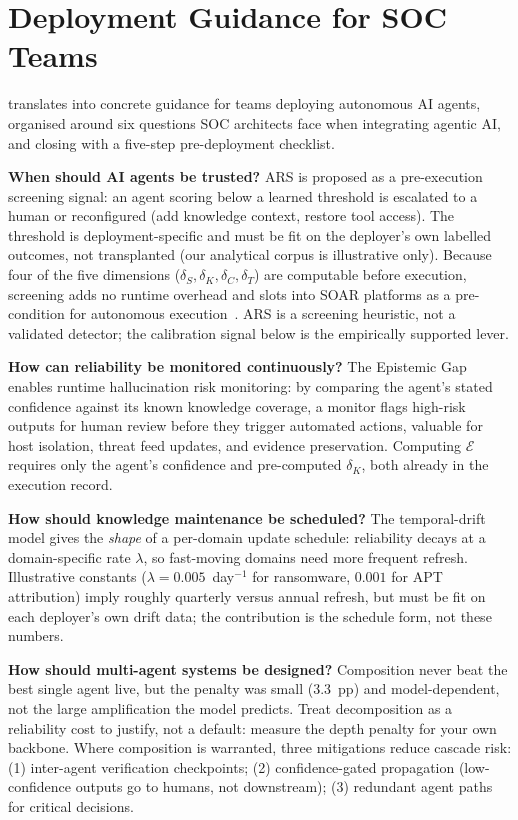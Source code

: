 \section{Deployment Guidance for SOC Teams}

\ARES{} translates into concrete guidance for teams deploying
autonomous AI agents, organised around six questions SOC architects
face when integrating agentic AI, and closing with a five-step
pre-deployment checklist.

\textbf{When should AI agents be trusted?}
ARS is proposed as a pre-execution screening signal: an agent scoring
below a learned threshold is escalated to a human or reconfigured
(add knowledge context, restore tool access). The threshold is
deployment-specific and must be fit on the deployer's own labelled
outcomes, not transplanted (our analytical corpus is illustrative
only). Because four of the five dimensions ($\delta_S, \delta_K,
\delta_C, \delta_T$) are computable before execution, screening adds no
runtime overhead and slots into SOAR platforms as a pre-condition for
autonomous execution~\cite{nist_ai_rmf}. ARS is a screening heuristic,
not a validated detector; the calibration signal below is the
empirically supported lever.

\textbf{How can reliability be monitored continuously?}
The Epistemic Gap enables runtime hallucination risk monitoring: by
comparing the agent's stated confidence against its known knowledge
coverage, a monitor flags high-risk outputs for human review before
they trigger automated actions, valuable for host isolation, threat
feed updates, and evidence preservation. Computing $\mathcal{E}$
requires only the agent's confidence and pre-computed $\delta_K$,
both already in the execution record.

\textbf{How should knowledge maintenance be scheduled?}
The temporal-drift model gives the \textit{shape} of a per-domain
update schedule: reliability decays at a domain-specific rate
$\lambda$, so fast-moving domains need more frequent refresh.
Illustrative constants ($\lambda = 0.005$~day$^{-1}$ for ransomware,
$0.001$ for APT attribution) imply roughly quarterly versus annual
refresh, but must be fit on each deployer's own drift data; the
contribution is the schedule form, not these numbers.

\textbf{How should multi-agent systems be designed?}
Composition never beat the best single agent live, but the penalty was
small ($3.3$~pp) and model-dependent, not the large amplification the
model predicts. Treat decomposition as a reliability cost to justify,
not a default: measure the depth penalty for your own backbone. Where
composition is warranted, three mitigations reduce cascade risk: (1)
inter-agent verification checkpoints; (2) confidence-gated propagation
(low-confidence outputs go to humans, not downstream); (3) redundant
agent paths for critical decisions.

